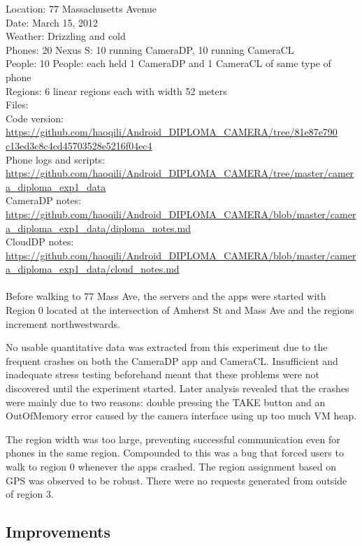 Location: 77 Massachusetts Avenue\\
Date: March 15, 2012\\
Weather: Drizzling and cold\\
Phones: 20 Nexus S: 10 running CameraDP, 10 running CameraCL\\
People: 10 People: each held 1 CameraDP and 1 CameraCL of same type of phone\\
Regions: 6 linear regions each with width 52 meters\\
Files:\\
Code version: {\url{https://github.com/haoqili/Android_DIPLOMA_CAMERA/tree/81e87e790}}\\
{\url{c13ed3c8c4cd45703528e5216f04ec4}}\\
Phone logs and scripts: {\url{https://github.com/haoqili/Android_DIPLOMA_CAMERA/tree/master/camera_diploma_exp1_data}}\\ 
CameraDP notes: {\url{https://github.com/haoqili/Android_DIPLOMA_CAMERA/blob/master/camera_diploma_exp1_data/diploma_notes.md}}\\
CloudDP notes: {\url{https://github.com/haoqili/Android_DIPLOMA_CAMERA/blob/master/camera_diploma_exp1_data/cloud_notes.md}}\\
\\
Before walking to 77 Mass Ave, the servers and the apps were started with Region 0 located at the intersection of Amherst St and Mass Ave and the regions increment northwestwards.

No usable quantitative data was extracted from this experiment due to the frequent crashes on both the CameraDP app and CameraCL. Insufficient and inadequate stress testing beforehand meant that these problems were not discovered until the experiment started. Later analysis revealed that the crashes were mainly due to two reasons: double pressing the TAKE button and an OutOfMemory error caused by the camera interface using up too much VM heap. 

The region width was too large, preventing successful communication even for phones in the same region. Compounded to this was a bug that forced users to walk to region 0 whenever the apps crashed. The region assignment based on GPS was observed to be robust. There were no requests generated from outside of region 3.

\subsection{Improvements}

